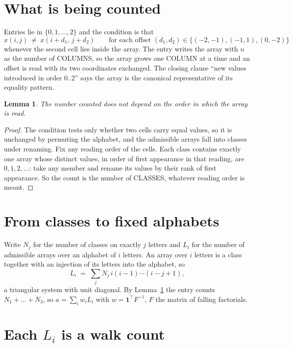 \documentclass[11pt,a4paper]{article}
\theoremstyle{plain}
\newtheorem{lemma}[theorem]{Lemma}
\theoremstyle{definition}
\begin{document}
\section{What is being counted}

Entries lie in $\{0,1,\dots,2\}$ and the condition is that
\[
x(i,j)\ \ne\ x(i+d_1,\,j+d_2)\qquad\text{for each offset }(d_1,d_2)\in\{(-2,-1), (-1,1), (0,-2)\}
\]
whenever the second cell lies inside the array. The entry writes the array with $n$ as the number of COLUMNS, so the array grows one COLUMN at a time and an offset is read with its two coordinates exchanged. The closing clause ``new values
introduced in order $0..2$'' says the array is the canonical representative of its equality
pattern.

\begin{lemma}\label{lem:order}
The number counted does not depend on the order in which the array is read.
\end{lemma}

\begin{proof}
The condition tests only whether two cells carry equal values, so it is unchanged by permuting
the alphabet, and the admissible arrays fall into classes under renaming. Fix any reading order
of the cells. Each class contains exactly one array whose distinct values, in order of first
appearance in that reading, are $0,1,2,\dots$: take any member and rename its values by their
rank of first appearance. So the count is the number of CLASSES, whatever reading order is
meant.
\end{proof}

\section{From classes to fixed alphabets}

Write $N_j$ for the number of classes on exactly $j$ letters and $L_i$ for the number of
admissible arrays over an alphabet of $i$ letters. An array over $i$ letters is a class together
with an injection of its letters into the alphabet, so
\[
L_i\;=\;\sum_j N_j\,i(i-1)\cdots(i-j+1),
\]
a triangular system with unit diagonal. By Lemma~\ref{lem:order} the entry counts
$N_1+\dots+N_{3}$, so $a=\sum_i w_iL_i$ with $w=\mathbf{1}^{\!\top}F^{-1}$, $F$ the
matrix of falling factorials.

\section{Each $L_i$ is a walk count}
\end{document}
